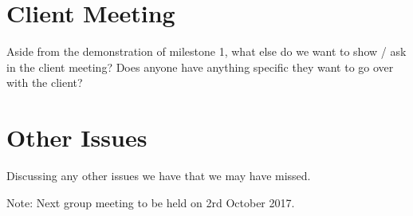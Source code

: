 \documentclass[11pt, a4paper]{article}
\begin{document}
  \section{ Client Meeting }
  Aside from the demonstration of milestone 1, what else do we want to show / ask in the client meeting? Does anyone have anything specific they want to go over with the client?
  
  \section { Other Issues }
  Discussing any other issues we have that we may have missed.
  
  \vspace*{10pt}
  \noindent Note: Next group meeting to be held on 2rd October 2017.

  
\end{document}
